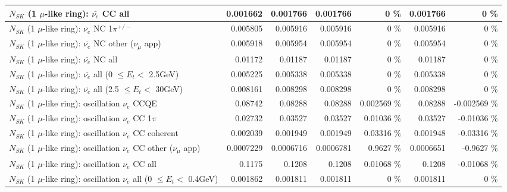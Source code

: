 \begin{table}
\begin{tabular}{| l | r | r | r  r | r  r |}
                            $N_{SK}$ (1 $\mu$-like ring): $\bar{\nu_{e}}$ CC all &        0.001662 &        0.001766 &        0.001766 &        0 \%  &        0.001766 &        0 \%  \\ 
\hline
                     $N_{SK}$ (1 $\mu$-like ring): $\bar{\nu_e}$ NC 1$\pi^{+/-}$ &        0.005805 &        0.005916 &        0.005916 &        0 \%  &        0.005916 &        0 \%  \\ 
            $N_{SK}$ (1 $\mu$-like ring): $\bar{\nu_e}$ NC other ($\nu_\mu$ app) &        0.005918 &        0.005954 &        0.005954 &        0 \%  &        0.005954 &        0 \%  \\ 
                            $N_{SK}$ (1 $\mu$-like ring): $\bar{\nu_{e}}$ NC all &         0.01172 &         0.01187 &         0.01187 &        0 \%  &         0.01187 &        0 \%  \\ 
\hline
     $N_{SK}$ (1 $\mu$-like ring): $\bar{\nu_{e}}$ all (0 $\leq E_{t} <$ 2.5GeV) &        0.005225 &        0.005338 &        0.005338 &        0 \%  &        0.005338 &        0 \%  \\ 
    $N_{SK}$ (1 $\mu$-like ring): $\bar{\nu_{e}}$ all (2.5 $\leq E_{t} <$ 30GeV) &        0.008161 &        0.008298 &        0.008298 &        0 \%  &        0.008298 &        0 \%  \\ 
\hline
\hline
\hline
                          $N_{SK}$ (1 $\mu$-like ring): oscillation $\nu_e$ CCQE &         0.08742 &         0.08288 &         0.08288 & 0.002569 \%  &         0.08288 & -0.002569 \%  \\ 
                     $N_{SK}$ (1 $\mu$-like ring): oscillation $\nu_e$ CC 1$\pi$ &         0.02732 &         0.03527 &         0.03527 &  0.01036 \%  &         0.03527 & -0.01036 \%  \\ 
                   $N_{SK}$ (1 $\mu$-like ring): oscillation $\nu_e$ CC coherent &        0.002039 &        0.001949 &        0.001949 &  0.03316 \%  &        0.001948 & -0.03316 \%  \\ 
      $N_{SK}$ (1 $\mu$-like ring): oscillation $\nu_e$ CC other ($\nu_\mu$ app) &       0.0007229 &       0.0006716 &       0.0006781 &   0.9627 \%  &       0.0006651 &  -0.9627 \%  \\ 
                       $N_{SK}$ (1 $\mu$-like ring): oscillation $\nu_e$  CC all &          0.1175 &          0.1208 &          0.1208 &  0.01068 \%  &          0.1208 & -0.01068 \%  \\ 
\hline
$N_{SK}$ (1 $\mu$-like ring): oscillation $\nu_{e}$ all (0 $\leq E_{t} <$ 0.4GeV) &        0.001862 &        0.001811 &        0.001811 &        0 \%  &        0.001811 &        0 \%  \\ 

\end{tabular}
\end{table}
